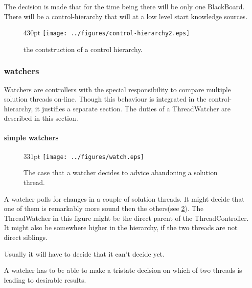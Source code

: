 \documentclass[]{lofar}
\begin{document}
        The decision is made that for the time being there will be
        only one BlackBoard. There will be a control-hierarchy that
        will at a low level start knowledge sources.

        \begin{figure}{430pt}
          \texttt{[image: ../figures/control-hierarchy2.eps]}
          \hypertarget{fig:control-hierarchy2}{}
          \caption{the contstruction of a control
          hierarchy.\label{fig:control-hierarchy2}}
        \end{figure}

      \subsubsection{watchers}
      \label{subsubsec:watchers}\hypertarget{subsubsec:watchers}{}

        Watchers are controllers with the special responsibility to
        compare multiple solution threads on-line. Though this
        behaviour is integrated in the control-hierarchy, it justifies
        a separate section. The duties of a ThreadWatcher are
        described in this section.

        \paragraph{simple watchers}
        \label{par:simple-watchers}\hypertarget{par:simple-watchers}{}
          \begin{figure}{331pt}
            \texttt{[image: ../figures/watch.eps]}
            \hypertarget{fig:watchers}{}
            \caption{The case that a watcher decides to advice
            abandoning a solution thread.\label{fig:watchers}}
          \end{figure}

          A watcher polls for changes in a couple of solution
          threads. It might decide that one of them is remarkably more
          sound then the others(see
          \hyperlink{fig:watchers}{\ref{fig:watchers}}). The
          ThreadWatcher in this figure might be the direct parent of
          the ThreadController. It might also be somewhere higher in
          the hierarchy, if the two threads are not direct siblings.

          Usually it will have to decide that it can't decide yet.

          \begin{requirement}
            A watcher has to be able to make a tristate decision on
            which of two threads is leading to desirable results.
            \caption{tristate decisions\label{req:no-decision}}
          \end{requirement}
\end{document}
